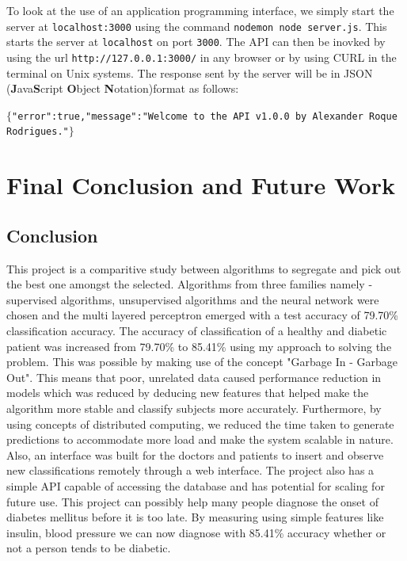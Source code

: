 \documentclass[12pt]{article}
\begin{document}
To look at the use of an application programming interface, we simply start the server at \texttt{localhost:3000} using the command \texttt{nodemon node server.js}. This starts the server at \texttt{localhost} on port \texttt{3000}. The API can then be inovked by using the url \texttt{http://127.0.0.1:3000/} in any browser or by using CURL in the terminal on Unix systems. The response sent by the server will be in JSON (\textbf{J}ava\textbf{S}cript \textbf{O}bject \textbf{N}otation)format as follows:
\begin{center}
$\lbrace$\texttt{"error":true,"message":"Welcome to the API v1.0.0 by Alexander Roque Rodrigues."}$\rbrace$
\end{center}







\clearpage
\newpage
\section{Final Conclusion and Future Work}
\subsection{Conclusion}
This project is a comparitive study between algorithms to segregate and pick out the best one amongst the selected. Algorithms from three families namely - supervised algorithms, unsupervised algorithms and the neural network were chosen and the multi layered perceptron emerged with a test accuracy of 79.70\% classification accuracy. The accuracy of classification of a healthy and diabetic patient was increased from 79.70\% to 85.41\% using my approach to solving the problem. This was possible by making use of the concept "Garbage In - Garbage Out". This means that poor, unrelated data caused performance reduction in models which was reduced by deducing new features that helped make the algorithm more stable and classify subjects more accurately. Furthermore, by using concepts of distributed computing, we reduced the time taken to generate predictions to accommodate more load and make the system scalable in nature. Also, an interface was built for the doctors and patients to insert and observe new classifications remotely through a web interface. The project also has a simple API capable of accessing the database and has potential for scaling for future use. This project can possibly help many people diagnose the onset of diabetes mellitus before it is too late. By measuring using simple features like insulin, blood pressure we can now diagnose with 85.41\% accuracy whether or not a person tends to be diabetic.
\end{document}
